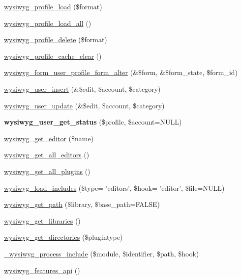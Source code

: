 \begin{DoxyCompactItemize}
\item 
\hyperlink{wysiwyg_8module_af7372d5c943dee94e03b2f0c50056638}{wysiwyg\_\-profile\_\-load} (\$format)
\item 
\hyperlink{wysiwyg_8module_aa23a280b799f030dee20a62248ec4673}{wysiwyg\_\-profile\_\-load\_\-all} ()
\item 
\hyperlink{wysiwyg_8module_ab4fc9985468b9ba8ecce5bbae05213fe}{wysiwyg\_\-profile\_\-delete} (\$format)
\item 
\hyperlink{wysiwyg_8module_a7667d1f74833f277925cb4b87949365b}{wysiwyg\_\-profile\_\-cache\_\-clear} ()
\item 
\hyperlink{wysiwyg_8module_a39cf10beffe3a191736440a4787e89c0}{wysiwyg\_\-form\_\-user\_\-profile\_\-form\_\-alter} (\&\$form, \&\$form\_\-state, \$form\_\-id)
\item 
\hyperlink{wysiwyg_8module_aa4b0ba2dca5e44102fb46134747fc6a8}{wysiwyg\_\-user\_\-insert} (\&\$edit, \$account, \$category)
\item 
\hyperlink{wysiwyg_8module_aecc5eb4da6cc87d7a96613956215c80f}{wysiwyg\_\-user\_\-update} (\&\$edit, \$account, \$category)
\item 
\hypertarget{wysiwyg_8module_a80e95ffa710c25d55591cdcdf9245264}{
{\bfseries wysiwyg\_\-user\_\-get\_\-status} (\$profile, \$account=NULL)}
\label{wysiwyg_8module_a80e95ffa710c25d55591cdcdf9245264}

\item 
\hyperlink{group__wysiwyg__api_gaf5c3c86f49f33be930fa6f9b5405a2a6}{wysiwyg\_\-get\_\-editor} (\$name)
\item 
\hyperlink{group__wysiwyg__api_gaf92d888d31e7e1adc2b7d8e763f62b33}{wysiwyg\_\-get\_\-all\_\-editors} ()
\item 
\hyperlink{group__wysiwyg__api_ga4b254b0ad93a619180087364bc415cde}{wysiwyg\_\-get\_\-all\_\-plugins} ()
\item 
\hyperlink{group__wysiwyg__api_gae5880da976120e85f7bb8aeda815b060}{wysiwyg\_\-load\_\-includes} (\$type= 'editors', \$hook= 'editor', \$file=NULL)
\item 
\hyperlink{group__wysiwyg__api_ga328c8919e7a4bb96cf7a19f098313319}{wysiwyg\_\-get\_\-path} (\$library, \$base\_\-path=FALSE)
\item 
\hyperlink{group__wysiwyg__api_ga2918aa22fa830564c63c0df96a625379}{wysiwyg\_\-get\_\-libraries} ()
\item 
\hyperlink{group__wysiwyg__api_ga47660e98db185a3c9de431b94e280977}{wysiwyg\_\-get\_\-directories} (\$plugintype)
\item 
\hyperlink{group__wysiwyg__api_ga81487ce9ea49d7ca7b052bb8f2e8fcc8}{\_\-wysiwyg\_\-process\_\-include} (\$module, \$identifier, \$path, \$hook)
\item 
\hyperlink{wysiwyg_8module_a50b7a796362c1595678743fc3d4307d7}{wysiwyg\_\-features\_\-api} ()
\end{DoxyCompactItemize}


